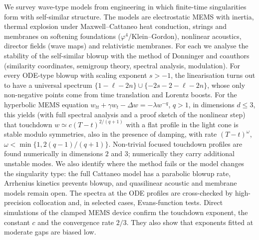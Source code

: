 We survey wave-type models from engineering in which finite-time singularities
form with self-similar structure. The models are electrostatic MEMS with
inertia, thermal explosion under Maxwell--Cattaneo heat conduction, strings
and membranes on softening foundations ($\varphi^4$/Klein--Gordon), nonlinear
acoustics, director fields (wave maps) and relativistic membranes. For each
we analyse the stability of the self-similar blowup with the method of
Donninger and coauthors (similarity coordinates, semigroup theory, spectral
analysis, modulation). For every ODE-type blowup with scaling exponent $s>-1$,
the linearisation turns out to have a universal spectrum
$\{1-\ell-2n\}\cup\{-2s-2-\ell-2n\}$, whose only non-negative points come from
time translation and Lorentz boosts. For the hyperbolic MEMS equation
$w_{tt}+\gamma w_t-\Delta w=-\lambda w^{-q}$, $q>1$, in dimensions $d\le3$, this yields (with full
spectral analysis and a proof sketch of the nonlinear step) that touchdown
$w\simeq c(T-t)^{2/(q+1)}$ with a flat profile in the light cone is stable
modulo symmetries, also in the presence of damping, with rate
$(T-t)^{\omega}$, $\omega<\min\{1,2(q-1)/(q+1)\}$. Non-trivial focused touchdown
profiles are found numerically in dimensions $2$ and $3$; numerically they
carry additional unstable modes. We
also identify where the method fails or the model changes the singularity
type: the full Cattaneo model has a parabolic blowup rate, Arrhenius kinetics
prevents blowup, and quasilinear acoustic and membrane models remain open.
The spectra at the ODE profiles are cross-checked by high-precision collocation
and, in selected cases, Evans-function tests. Direct simulations of the clamped MEMS device confirm
the touchdown exponent, the constant $c$ and the convergence rate $2/3$. They
also show that exponents fitted at moderate gaps are biased low.
